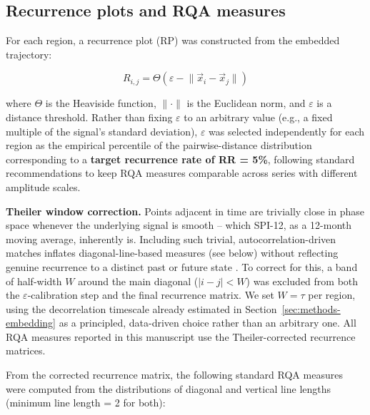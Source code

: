 \documentclass[climate,article,submit,moreauthors]{Definitions/mdpi}
\begin{document}
\subsection{Recurrence plots and RQA measures}
\label{sec:methods-rqa}

For each region, a recurrence plot (RP) was constructed from the embedded
trajectory:

\begin{equation}
R_{i,j} = \Theta(\varepsilon - \lVert \vec{x}_i - \vec{x}_j \rVert)
\label{eq:rp}
\end{equation}

where $\Theta$ is the Heaviside function, $\lVert \cdot \rVert$ is the Euclidean
norm, and $\varepsilon$ is a distance threshold. Rather than fixing $\varepsilon$
to an arbitrary value (e.g., a fixed multiple of the signal's standard
deviation), $\varepsilon$ was selected independently for each region as the
empirical percentile of the pairwise-distance distribution corresponding to a
\textbf{target recurrence rate of RR = 5\%}, following standard recommendations
\cite{Marwan2007} to keep RQA measures comparable across series with different
amplitude scales.

\textbf{Theiler window correction.} Points adjacent in time are trivially close
in phase space whenever the underlying signal is smooth -- which SPI-12, as a
12-month moving average, inherently is. Including such trivial,
autocorrelation-driven matches inflates diagonal-line-based measures (see below)
without reflecting genuine recurrence to a distinct past or future state
\cite{Theiler1986}. To correct for this, a band of half-width $W$ around the
main diagonal ($|i-j| < W$) was excluded from both the $\varepsilon$-calibration
step and the final recurrence matrix. We set $W = \tau$ per region, using the
decorrelation timescale already estimated in
Section~\ref{sec:methods-embedding} as a principled, data-driven choice rather
than an arbitrary one. All RQA measures reported in this manuscript use the
Theiler-corrected recurrence matrices.

From the corrected recurrence matrix, the following standard RQA measures
\cite{Marwan2007} were computed from the distributions of diagonal and
vertical line lengths (minimum line length = 2 for both):
\end{document}
